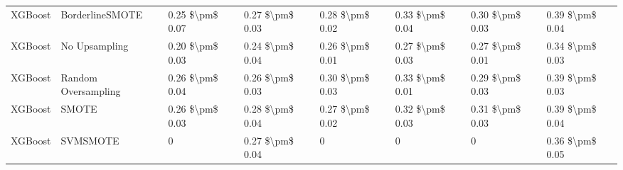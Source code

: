 \begin{tabular}{llllllll}
                        XGBoost &               BorderlineSMOTE & 0.25 \$\textbackslash pm\$ 0.07 &           0.27 \$\textbackslash pm\$ 0.03 &       0.28 \$\textbackslash pm\$ 0.02 &        0.33 \$\textbackslash pm\$ 0.04 &                         0.30 \$\textbackslash pm\$ 0.03 &     0.39 \$\textbackslash pm\$ 0.04 \\
                        XGBoost &                 No Upsampling & 0.20 \$\textbackslash pm\$ 0.03 &           0.24 \$\textbackslash pm\$ 0.04 &       0.26 \$\textbackslash pm\$ 0.01 &        0.27 \$\textbackslash pm\$ 0.03 &                         0.27 \$\textbackslash pm\$ 0.01 &     0.34 \$\textbackslash pm\$ 0.03 \\
                        XGBoost &           Random Oversampling & 0.26 \$\textbackslash pm\$ 0.04 &           0.26 \$\textbackslash pm\$ 0.03 &       0.30 \$\textbackslash pm\$ 0.03 &        0.33 \$\textbackslash pm\$ 0.01 &                         0.29 \$\textbackslash pm\$ 0.03 &     0.39 \$\textbackslash pm\$ 0.03 \\
                        XGBoost &                         SMOTE & 0.26 \$\textbackslash pm\$ 0.03 &           0.28 \$\textbackslash pm\$ 0.04 &       0.27 \$\textbackslash pm\$ 0.02 &        0.32 \$\textbackslash pm\$ 0.03 &                         0.31 \$\textbackslash pm\$ 0.03 &     0.39 \$\textbackslash pm\$ 0.04 \\
                        XGBoost &                      SVMSMOTE &               0 &           0.27 \$\textbackslash pm\$ 0.04 &                     0 &                      0 &                                       0 &     0.36 \$\textbackslash pm\$ 0.05 \\
\bottomrule
\end{tabular}
